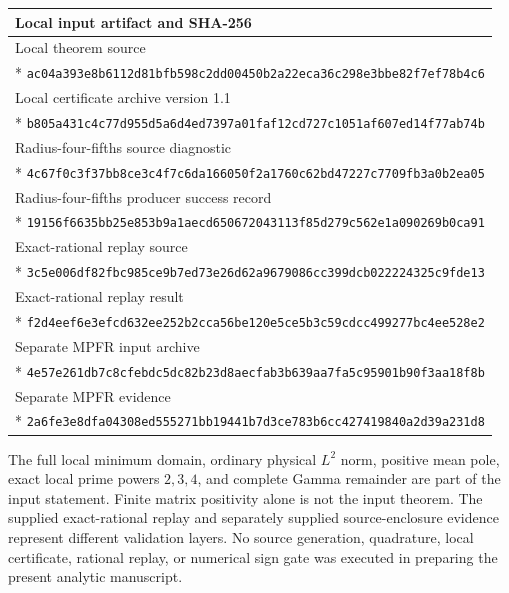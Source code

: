 \documentclass[11pt,a4paper]{article}
\numberwithin{equation}{section}
\theoremstyle{definition}\newtheorem{definition}[theorem]{Definition}
\theoremstyle{remark}\newtheorem{remark}[theorem]{Remark}
\begin{document}
\begingroup\small
\begin{longtable}{@{}p{}@{}}
\toprule Local input artifact and SHA-256\\\midrule\endhead
Local theorem source\\*
\nolinkurl{ac04a393e8b6112d81bfb598c2dd00450b2a22eca36c298e3bbe82f7ef78b4c6}\\[3pt]
Local certificate archive version 1.1\\*
\nolinkurl{b805a431c4c77d955d5a6d4ed7397a01faf12cd727c1051af607ed14f77ab74b}\\[3pt]
Radius-four-fifths source diagnostic\\*
\nolinkurl{4c67f0c3f37bb8ce3c4f7c6da166050f2a1760c62bd47227c7709fb3a0b2ea05}\\[3pt]
Radius-four-fifths producer success record\\*
\nolinkurl{19156f6635bb25e853b9a1aecd650672043113f85d279c562e1a090269b0ca91}\\[3pt]
Exact-rational replay source\\*
\nolinkurl{3c5e006df82fbc985ce9b7ed73e26d62a9679086cc399dcb022224325c9fde13}\\[3pt]
Exact-rational replay result\\*
\nolinkurl{f2d4eef6e3efcd632ee252b2cca56be120e5ce5b3c59cdcc499277bc4ee528e2}\\[3pt]
Separate MPFR input archive\\*
\nolinkurl{4e57e261db7c8cfebdc5dc82b23d8aecfab3b639aa7fa5c95901b90f3aa18f8b}\\[3pt]
Separate MPFR evidence\\*
\nolinkurl{2a6fe3e8dfa04308ed555271bb19441b7d3ce783b6cc427419840a2d39a231d8}\\
\bottomrule
\end{longtable}\endgroup
The full local minimum domain, ordinary physical $L^2$ norm, positive mean pole, exact local prime powers $2,3,4$, and complete Gamma remainder are part of the input statement.
Finite matrix positivity alone is not the input theorem.
The supplied exact-rational replay and separately supplied source-enclosure evidence represent different validation layers.
No source generation, quadrature, local certificate, rational replay, or numerical sign gate was executed in preparing the present analytic manuscript.
\end{document}
